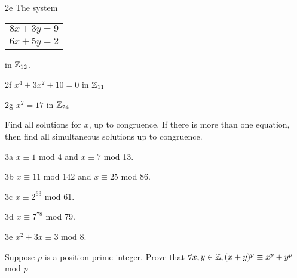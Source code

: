 \begin{question}{2e}
The system 
\begin{tabular}{l}
$8x + 3y=9$\\
$6x + 5y=2$
\end{tabular}
in $\mathbb{Z}_{12}$.

\end{question}

\begin{question}{2f}
$x^4 + 3x^2 +10 = 0$ in $\mathbb{Z}_{11}$
\end{question}

\begin{question}{2g}
$x^2 = 17$ in $\mathbb{Z}_{24}$
\end{question}



\begin{question}{3}
Find all solutions for $x$, up to congruence. If there is more than one equation, then find all simultaneous solutions up to congruence.
\end{question}


\begin{question}{3a}
$x \equiv 1$ mod 4 and $x \equiv 7$ mod 13.
\end{question}

\begin{question}{3b}
$x \equiv 11$ mod 142 and $x \equiv 25$ mod 86.
\end{question}

\begin{question}{3c}
$x \equiv 2^{63}$ mod 61.
\end{question}

\begin{question}{3d}
$x \equiv 7^{78}$ mod 79.
\end{question}

\begin{question}{3e}
$x^2 + 3x \equiv 3$ mod 8.
\end{question}


\begin{question}{4}
Suppose $p$ is a position prime integer. Prove that $\forall x,y \in \mathbb{Z}, (x+y)^p \equiv x^p + y^p$ mod $p$
\end{question}

